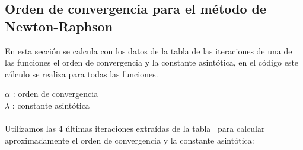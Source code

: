 \clearpage

\subsection{Orden de convergencia para el método de Newton-Raphson }

En esta sección se calcula con los datos de la tabla de las iteraciones de una de las funciones el orden de convergencia y la constante asintótica, en el código este cálculo se realiza para todas las funciones.



\edef\iterationscount{\DTLrowcount{extraresultsnrdb}}

\edef\iterl{\iterationscount}
\edef\iterlp{\intcalcDec{\iterl}}
\edef\iterlpp{\intcalcDec{\iterlp}}
\edef\iterlppp{\intcalcDec{\iterlpp}}







\edef\theval{\num[round-precision=\figurescount, round-mode=places, group-digits=false]{\val}}


{
\setlength{\parindent}{0pt}
$\alpha$ : orden de convergencia\\
$\lambda$ : constante asintótica\\
}\\

Utilizamos las 4 últimas iteraciones extraídas de la tabla~ para calcular aproximadamente el orden de convergencia y la constante asintótica:


